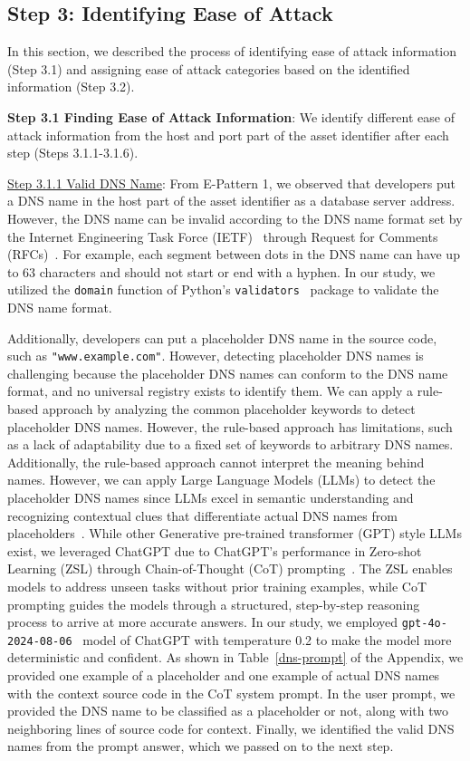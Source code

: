 \subsection{Step 3: Identifying Ease of Attack}

In this section, we described the process of identifying ease of attack information (Step 3.1) and assigning ease of attack categories based on the identified information (Step 3.2).

\textbf{Step 3.1 Finding Ease of Attack Information}: We identify different ease of attack information from the host and port part of the asset identifier after each step (Steps 3.1.1-3.1.6).

\uline{Step 3.1.1 Valid DNS Name}: From E-Pattern 1, we observed that developers put a DNS name in the host part of the asset identifier as a database server address. However, the DNS name can be invalid according to the DNS name format set by the Internet Engineering Task Force (IETF)~\cite{ietf} through Request for Comments (RFCs)~\cite{rfc}. For example, each segment between dots in the DNS name can have up to 63 characters and should not start or end with a hyphen. In our study, we utilized the \texttt{domain} function of Python's \texttt{validators}~\cite{validators} package to validate the DNS name format. 

Additionally, developers can put a placeholder DNS name in the source code, such as \texttt{"www.example.com"}. However, detecting placeholder DNS names is challenging because the placeholder DNS names can conform to the DNS name format, and no universal registry exists to identify them. We can apply a rule-based approach by analyzing the common placeholder keywords to detect placeholder DNS names. However, the rule-based approach has limitations, such as a lack of adaptability due to a fixed set of keywords to arbitrary DNS names. Additionally, the rule-based approach cannot interpret the meaning behind names. However, we can apply Large Language Models (LLMs) to detect the placeholder DNS names since LLMs excel in semantic understanding and recognizing contextual clues that differentiate actual DNS names from placeholders~\cite{liu2023summary, yang2024harnessing}. While other Generative pre-trained transformer (GPT) style LLMs exist, we leveraged ChatGPT due to ChatGPT's performance in Zero-shot Learning (ZSL) through Chain-of-Thought (CoT) prompting~\cite{yang2024harnessing, wei2022chain, brown2020language}. The ZSL enables models to address unseen tasks without prior training examples, while CoT prompting guides the models through a structured, step-by-step reasoning process to arrive at more accurate answers. In our study, we employed \texttt{gpt-4o-2024-08-06}~\cite{gpt-model} model of ChatGPT with temperature 0.2 to make the model more deterministic and confident. As shown in Table~\ref{dns-prompt} of the Appendix, we provided one example of a placeholder and one example of actual DNS names with the context source code in the CoT system prompt. In the user prompt, we provided the DNS name to be classified as a placeholder or not, along with two neighboring lines of source code for context. Finally, we identified the valid DNS names from the prompt answer, which we passed on to the next step.



